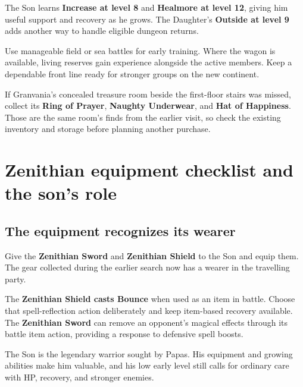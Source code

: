 The Son learns \textbf{Increase at level 8} and
\textbf{Healmore at level 12}, giving him useful support and
recovery as he grows. The Daughter's \textbf{Outside at level 9}
adds another way to handle eligible dungeon returns.

Use manageable field or sea battles for early training. Where the
wagon is available, living reserves gain experience alongside the
active members. Keep a dependable front line ready for stronger
groups on the new continent.

If Granvania's concealed treasure room beside the first-floor stairs
was missed, collect its \textbf{Ring of Prayer},
\textbf{Naughty Underwear}, and \textbf{Hat of Happiness}.
Those are the same room's finds from the earlier visit, so check
the existing inventory and storage before planning another purchase.

\section{Zenithian equipment checklist and the son's role}

\subsection*{The equipment recognizes its wearer}

Give the \textbf{Zenithian Sword} and \textbf{Zenithian Shield}
to the Son and equip them. The gear collected during the earlier
search now has a wearer in the travelling party.

The \textbf{Zenithian Shield casts Bounce} when used as an
item in battle. Choose that spell-reflection action deliberately
and keep item-based recovery available. The \textbf{Zenithian Sword}
can remove an opponent's magical effects through its battle item
action, providing a response to defensive spell boosts.

The Son is the legendary warrior sought by Papas. His equipment
and growing abilities make him valuable, and his low early level
still calls for ordinary care with HP, recovery, and stronger enemies.

